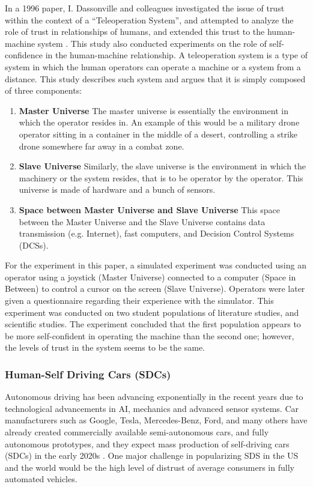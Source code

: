 \documentclass[runningheads,a4paper]{llncs}
\begin{document}
In a 1996 paper, I. Dassonville and colleagues investigated the issue of trust within the context of a ``Teleoperation System'', and attempted to analyze the role of trust in relationships of humans, and extended this trust to the human-machine system \cite{dassonville1996trust}. This study also conducted experiments on the role of self-confidence in the human-machine relationship. A teleoperation system is a type of system in which the human operators can operate a machine or a system from a distance. This study describes such system and argues that it is simply composed of three components:
\begin{enumerate}
    \item \textbf{Master Universe}
    The master universe is essentially the environment in which the operator resides in. An example of this would be a military drone operator sitting in a container in the middle of a desert, controlling a strike drone somewhere far away in a combat zone. 
\item \textbf{Slave Universe}
Similarly, the slave universe is the environment in which the machinery or the system resides, that is to be operator by the operator. This universe is made of hardware and a bunch of sensors.
\item \textbf{Space between Master Universe and Slave Universe}
This space between the Master Universe and the Slave Universe contains data transmission (e.g. Internet), fast computers, and Decision Control Systems (DCSs).
\end{enumerate}

For the experiment in this paper, a simulated experiment was conducted using an operator using a joystick (Master Universe) connected to a computer (Space in Between) to control a cursor on the screen (Slave Universe). Operators were later given a questionnaire regarding their experience with the simulator. This experiment was conducted on two student populations of literature studies, and scientific studies. The experiment concluded that the first population appears to be more self-confident in operating the machine than the second one; however, the levels of trust in the system seems to be the same.

\subsubsection{Human-Self Driving Cars (SDCs)}
Autonomous driving has been advancing exponentially in the recent years due to technological advancements in AI, mechanics and advanced sensor systems. Car manufacturers such as Google, Tesla, Mercedes-Benz, Ford, and many others have already created commercially available semi-autonomous cars, and fully autonomous prototypes, and they expect mass production of self-driving cars (SDCs) in the early 2020s \cite{driverlessFutureForcast}. One major challenge in popularizing SDS in the US and the world would be the high level of distrust of average consumers in fully automated vehicles.
\end{document}
